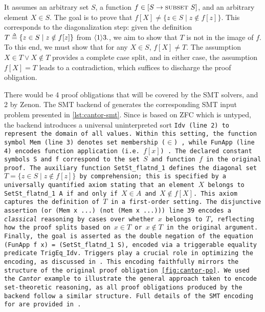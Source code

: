 It assumes an arbitrary set $S$, a function $f \in [S \rightarrow \mbox{\scshape subset}\ S]$, and an arbitrary element $X \in S$.
The goal is to prove that $f[X] \neq \{ z \in S \mid z \notin f[z] \}$.
This corresponds to the diagonalization step: given the definition $T \mathrel{\smash{\stackrel{\scriptscriptstyle\Delta}{=}}} \{ z \in S \mid z \notin f[z] \}$ from $\langle 1 \rangle 3.$, we aim to show that $T$ is not in the image of $f$.
To this end, we must show that for any $X \in S$, $f[X] \neq T$.
The assumption $X \in T \lor X \notin T$ provides a complete case split, and in either case, the assumption $f[X] = T$ leads to a contradiction, which suffices to discharge the proof obligation.


\smallskip



\smallskip

There would be 4 proof obligations that will be covered by the SMT solvers, and 2 by Zenon. 
The SMT backend of \tlaplus generates the corresponding SMT input problem presented in \cref{lst:cantor-smt}.
Since \tlaplus is based on ZFC which is untyped, the backend introduces a universal uninterpreted sort \tt{Idv} (line 2) to represent the domain of all values.
Within this setting,  the function symbol \tt{Mem} (line 3) denotes set membership ($\in$)  ,  while \tt{FunApp} (line 4) encodes function application (i.e. $f[x]$) .
The declared constant symbols \tt{S} and \tt{f} correspond to the set $S$ and function $f$ in the original proof.
The auxiliary function \tt{SetSt\_flatnd\_1} defines the diagonal set $T = \{ z \in S \mid z \notin f[z] \}$ by comprehension; this is specified by a universally quantified axiom stating that an element $X$ belongs to \tt{SetSt\_flatnd\_1 A} if and only if $X \in A$ and $X \notin f[X]$.
This axiom captures the definition of $T$ in a first-order setting.
The disjunctive assertion \tt{(or (Mem x ...) (not (Mem x ...)))} line 39 encodes a \emph{classical} reasoning by cases over whether $x$ belongs to $T$, reflecting how the proof splits based on $x \in T$ or $x \notin T$ in the original \tlaplus argument. 
Finally, the goal is asserted as the double negation of the equation \tt{(FunApp f x) = (SetSt\_flatnd\_1 S)}, encoded via a triggerable equality predicate \tt{TrigEq\_Idv}.
Triggers play a crucial role in optimizing the encoding, as discussed in \cite[\S3]{new-encoding-tlaps}.
%
This encoding faithfully mirrors the structure of the original \tlaplus proof obligation \cref{fig:cantor-po}.
We used the \textit{Cantor} example to illustrate the general approach taken to encode set-theoretic reasoning, as all proof obligations produced by the backend follow a similar structure.
Full details of the SMT encoding for \tlaplus are provided in \cite{new-encoding-tlaps}.

